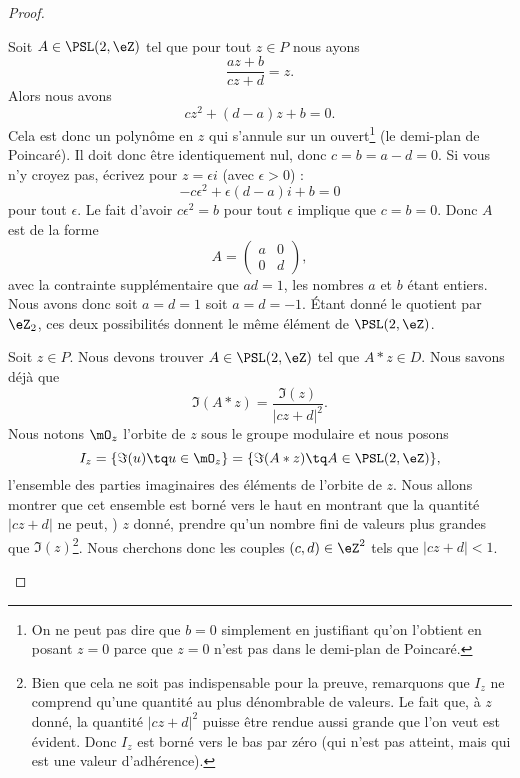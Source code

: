 \begin{proof}
\begin{subproof}
		Soit \( A\in\PSL(2,\eZ)\) tel que pour tout \( z\in P\) nous ayons
		\begin{equation}
			\frac{ az+b }{ cz+d }=z.
		\end{equation}
		Alors nous avons
		\begin{equation}
			cz^2+(d-a)z+b=0.
		\end{equation}
		Cela est donc un polynôme en \( z\) qui s'annule sur un ouvert\footnote{On ne peut pas dire que \( b=0\) simplement en justifiant qu'on l'obtient en posant \( z=0\) parce que \( z=0\) n'est pas dans le demi-plan de Poincaré.} (le demi-plan de Poincaré). Il doit donc être identiquement nul, donc \( c=b=a-d=0\). Si vous n'y croyez pas, écrivez pour \( z=\epsilon i\) (avec \( \epsilon>0\)) :
		\begin{equation}
			-c\epsilon^2+\epsilon(d-a)i+b=0
		\end{equation}
		pour tout \( \epsilon\). Le fait d'avoir \( c\epsilon^2=b\) pour tout \( \epsilon\) implique que \( c=b=0\). Donc \( A\) est de la forme
		\begin{equation}
			A=\begin{pmatrix}
				a & 0 \\
				0 & d
			\end{pmatrix},
		\end{equation}
		avec la contrainte supplémentaire que \( ad=1\), les nombres \( a\) et \( b\) étant entiers. Nous avons donc soit \( a=d=1\) soit \( a=d=-1\). Étant donné le quotient par \( \eZ_2\), ces deux possibilités donnent le même élément de \( \PSL(2,\eZ)\).



		Soit \( z\in P\). Nous devons trouver \( A\in\PSL(2,\eZ)\) tel que \( A*z\in D\). Nous savons déjà que
		\begin{equation}
			\Im(A*z)=\frac{ \Im(z) }{ | cz+d |^2 }.
		\end{equation}
		Nous notons \( \mO_z\) l'orbite de \( z\) sous le groupe modulaire et nous posons
		\begin{equation}
			I_z=\{ \Im(u)\tq u\in \mO_z \}=\{ \Im(A*z)\tq A\in\PSL(2,\eZ) \},
		\end{equation}
		l'ensemble des parties imaginaires des éléments de l'orbite de \( z\). Nous allons montrer que cet ensemble est borné vers le haut en montrant que la quantité \( | cz+d |\) ne peut, ) \( z\) donné, prendre qu'un nombre fini de valeurs plus grandes que \( \Im(z)\)\footnote{Bien que cela ne soit pas indispensable pour la preuve, remarquons que \( I_z\) ne comprend qu'une quantité au plus dénombrable de valeurs. Le fait que, à \( z\) donné, la quantité \( | cz+d |^2\) puisse être rendue aussi grande que l'on veut est évident. Donc \( I_z\) est borné vers le bas par zéro (qui n'est pas atteint, mais qui est une valeur d'adhérence).}. Nous cherchons donc les couples \( (c,d)\in \eZ^2\) tels que \( | cz+d |<1\).


\end{subproof}
\end{proof}
